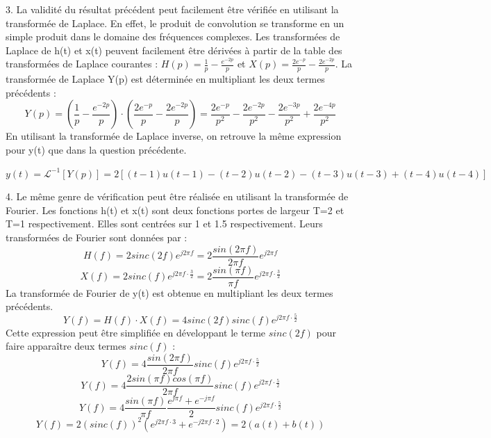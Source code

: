 \documentclass[11pt]{report}
\begin{document}
	3. La validité du résultat précédent peut facilement être vérifiée en utilisant la transformée de Laplace. En effet, le produit de convolution se transforme en un simple produit dans le domaine des fréquences complexes.
	Les transformées de Laplace de h(t) et x(t) peuvent facilement être dérivées à partir de la table des transformées de Laplace courantes : $H(p) = \frac{1}{p}-\frac{e^{-2p}}{p}$ et $X(p)=\frac{2e^{-p}}{p}-\frac{2e^{-2p}}{p}$. La transformée de Laplace Y(p) est déterminée en multipliant les deux termes précédents :
	\begin{equation*}
	Y(p)=(\frac{1}{p}-\frac{e^{-2p}}{p})\cdot(\frac{2e^{-p}}{p}-\frac{2e^{-2p}}{p})=\frac{2e^{-p}}{p^{2}}-\frac{2e^{-2p}}{p^{2}}-\frac{2e^{-3p}}{p^{2}}+\frac{2e^{-4p}}{p^{2}}
	\end{equation*}
	En utilisant la transformée de Laplace inverse, on retrouve la même expression pour y(t) que dans la question précédente.
	
		$y(t)=\mathcal{L}^{-1}[Y(p)]=2[(t-1)u(t-1)-(t-2)u(t-2)-(t-3)u(t-3)+(t-4)u(t-4)]$
	
	\vspace{0.5\baselineskip}
	
	4. Le même genre de vérification peut être réalisée en utilisant la transformée de Fourier. Les fonctions h(t) et x(t) sont deux fonctions portes de largeur T=2 et T=1 respectivement. Elles sont centrées sur 1 et 1.5 respectivement. Leurs transformées de Fourier sont données par :
	\begin{equation*}
	H(f)=2sinc(2f)e^{j2\pi f}=2\frac{sin(2\pi f)}{2\pi f}e^{j2\pi f}
	\end{equation*}
	\begin{equation*}
	X(f)=2sinc(f)e^{j2\pi f\cdot \frac{3}{2}}=2\frac{sin(\pi f)}{\pi f}e^{j2\pi f\cdot \frac{3}{2}}
	\end{equation*}
	La transformée de Fourier de y(t) est obtenue en multipliant les deux termes précédents.
	\begin{equation*}
	Y(f)=H(f) \cdot X(f) = 4sinc(2f)sinc(f)e^{j2\pi f\cdot \frac{5}{2}}
	\end{equation*}
	Cette expression peut être simplifiée en développant le terme $sinc(2f)$ pour faire apparaître deux termes $sinc(f)$ :
	\begin{equation*}
		Y(f)=4\frac{sin(2\pi f)}{2\pi f}sinc(f)e^{j2\pi f\cdot \frac{5}{2}}
	\end{equation*}
	\begin{equation*}
	Y(f)=4\frac{2sin(\pi f)cos(\pi f)}{2\pi f}sinc(f)e^{j2\pi f\cdot \frac{5}{2}}
	\end{equation*}
	\begin{equation*}
	Y(f)=4\frac{sin(\pi f)}{\pi f}\frac{e^{j\pi f}+e^{-j\pi f}}{2}sinc(f)e^{j2\pi f\cdot \frac{5}{2}}
	\end{equation*}
	\begin{equation*}
	Y(f)=2(sinc(f))^{2}(e^{j2\pi f\cdot 3}+e^{-j2\pi f\cdot 2})=2(a(t)+b(t))
	\end{equation*}
	
\end{document}
